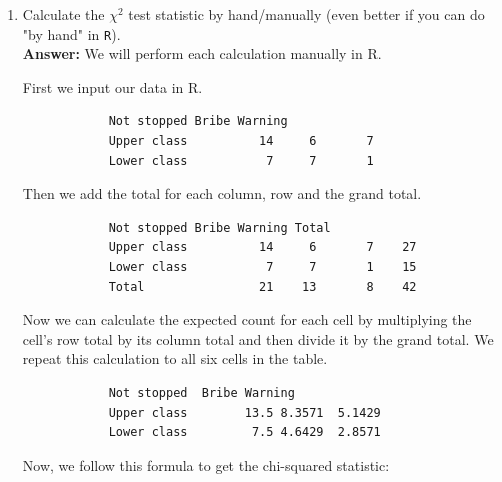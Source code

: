 \documentclass[12pt,letterpaper]{article}
\begin{document}
	\begin{enumerate}
		\item [(a)] Calculate the $\chi^2$ test statistic by hand/manually (even better if you can do "by hand" in \texttt{R}).\\
		
		\vspace{.25cm}
		\textbf{Answer:} We will perform each calculation manually in R. 
		
		First we input our data in R.
		
		
		
		\begin{verbatim}
			Not stopped Bribe Warning
			Upper class          14     6       7
			Lower class           7     7       1
		\end{verbatim}
		
		\vspace{.25cm}
		
		Then we add the total for each column, row and the grand total.
		
		
		
		
		
		\begin{verbatim}
			Not stopped Bribe Warning Total
			Upper class          14     6       7    27
			Lower class           7     7       1    15
			Total                21    13       8    42
		\end{verbatim}
		
		\vspace{.25cm}
		Now we can calculate the expected count for each cell by multiplying the cell's row total by its column total and then divide it by the grand total. We repeat this calculation to all six cells in the table.
		
		
		
		\begin{verbatim}
			Not stopped  Bribe Warning
			Upper class        13.5 8.3571  5.1429
			Lower class         7.5 4.6429  2.8571
		\end{verbatim}
		
		\vspace{.25cm}
		
		Now, we follow this formula to get the chi-squared statistic:
		

\end{enumerate}
\end{document}
